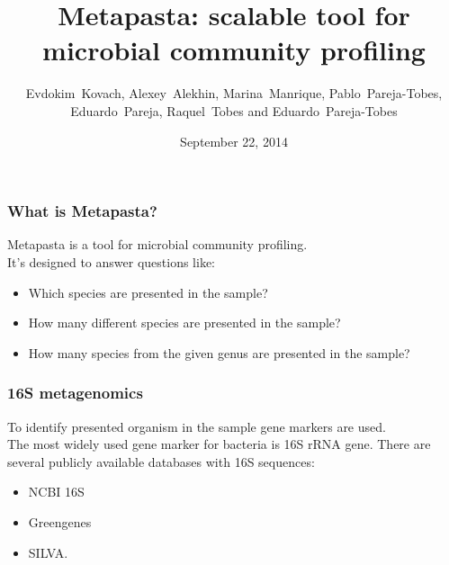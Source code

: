 \documentclass{beamer}
\title[Metapasta]{Metapasta: scalable tool for microbial community profiling
} %
\author{Evdokim~Kovach, Alexey~Alekhin, Marina~Manrique, Pablo~Pareja-Tobes, Eduardo~Pareja, Raquel~Tobes and Eduardo~Pareja-Tobes} %
\institute[Era7] %
{
Oh no sequences! Research Group, Era7 bioinformatics
 \\ %
Granada, Spain
}
\date{September 22, 2014} %
\begin{document}
\begin{frame}
\titlepage %
\end{frame}



\begin{frame}
\frametitle{What is Metapasta?}

Metapasta is a tool for microbial community profiling.\\
\vspace{1em}
It's designed to answer questions like:
\begin{itemize}
  \item Which species are presented in the sample?
  \item How many different species are presented in the sample? 
  \item How many species from the given genus are presented in the sample?
\end{itemize}

\end{frame}


\begin{frame}
\frametitle{16S metagenomics}

To identify presented organism in the sample gene markers are used.\\
\vspace{1em}
The most widely used gene marker for bacteria is 16S rRNA gene. There are several publicly available databases with 16S sequences:

\begin{itemize}
  \item NCBI 16S
  \item Greengenes
  \item SILVA.
\end{itemize}
\end{frame}
\end{document}
